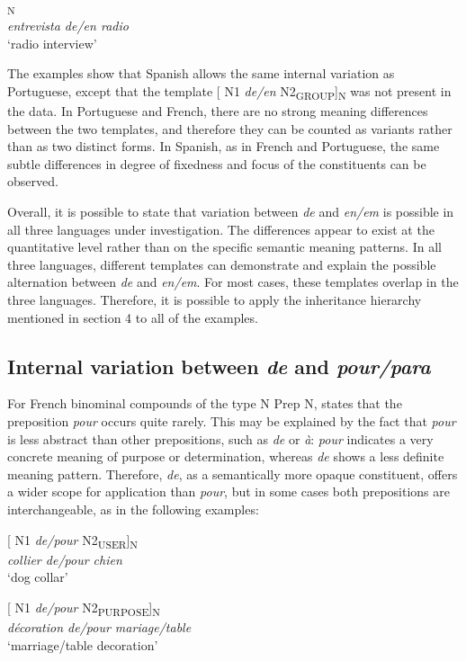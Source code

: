 \documentclass[output=paper]{langsci/langscibook}
\begin{document}
\ea{}\textsubscript{N}\\
\textit{entrevista de/en radio}\\
`radio interview'
\z

The examples show that Spanish allows the same internal variation as Portuguese, except that the template [ N1 \textit{de/en} N2\textsubscript{GROUP}]\textsubscript{N} was not present in the data. In Portuguese and French, there are no strong meaning differences between the two templates, and therefore they can be counted as variants rather than as two distinct forms. In Spanish, as in French and Portuguese, the same subtle differences in degree of fixedness and focus of the constituents can be observed. 

Overall, it is possible to state that variation between \textit{de} and \textit{en/em} is possible in all three languages under investigation. The differences appear to exist at the quantitative level rather than on the specific semantic meaning patterns. In all three languages, different templates can demonstrate and explain the possible alternation between \textit{de} and \textit{en/em}. For most cases, these templates overlap in the three languages. Therefore, it is possible to apply the inheritance hierarchy mentioned in section 4 to all of the examples.

 \subsection{Internal variation between \textit{de} and \textit{pour/para}}
 
 For French binominal compounds of the type N Prep N, \citet{Laumann:1998} states that the preposition \textit{pour} occurs quite rarely. This may be explained by the fact that \textit{pour} is less abstract than other prepositions, such as \textit{de} or \textit{à}: \textit{pour }indicates a very concrete meaning of purpose or determination, whereas \textit{de} shows a less definite meaning pattern. Therefore, \textit{de}, as a semantically more opaque constituent, offers a wider scope for application than \textit{pour}, but in some cases both prepositions are interchangeable, as in the following examples:

\begin{exe}\ex\begin{minipage}[t]{0.4\textwidth}    %
[ N1 \textit{de/pour} N2\textsubscript{USER}]\textsubscript{N}\\
\textit{collier de/pour chien}\\
`dog collar'
\end{minipage}\hfill%
\begin{minipage}[t]{0.45\textwidth}
[ N1 \textit{de/pour} N2\textsubscript{PURPOSE}]\textsubscript{N}\\
\textit{décoration de/pour mariage/table}\\
`marriage/table decoration'
\end{minipage}
\end{exe}
\end{document}
